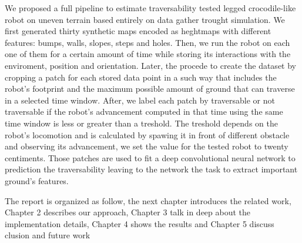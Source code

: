 \documentclass[../document.tex]{subfiles}
\begin{document}
We proposed a full pipeline to estimate traversability tested legged crocodile-like robot on uneven terrain based entirely on data gather trought simulation. We first generated thirty synthetic maps encoded as heghtmaps with different features: bumps, walls, slopes, steps and holes. Then, we run the robot on each one of them for a certain amount of time while storing its interactions with the enviroment, position and orientation. Later, the procede to create the dataset by cropping a patch for each stored data point in a such way that includes the robot's footprint and the maximum possible amount of ground that can traverse in a selected time window. After, we label each patch by traversable or not traversable if the robot's advancement computed in that time using the same time window is less or greater than a treshold. The treshold depends on the robot's locomotion and is calculated by spawing it in front of different obstacle and observing its advancement, we set the value for the tested robot to twenty centiments. Those patches are used to fit a deep convolutional neural network to prediction the traversability leaving to the network the task to extract important ground's features.

The report is organized as follow, the next chapter  introduces the related work, Chapter 2 describes our approach, Chapter 3 talk in deep about the implementation details,
Chapter 4 shows the results and Chapter 5 discuss clusion and future work
\end{document}
